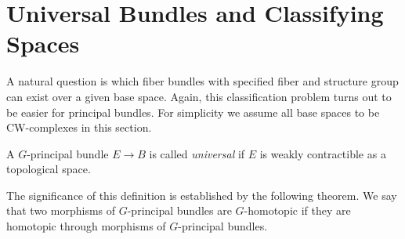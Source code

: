 
\section{Universal Bundles and Classifying Spaces}
A natural question is which fiber bundles with specified fiber and structure group can exist over a given base space. Again, this classification problem turns out to be easier for principal bundles.
For simplicity we assume all base spaces to be CW-complexes in this section.

\begin{definition}
    A $G$-principal bundle $E \to B$ is called \textit{universal} if $E$ is weakly contractible as a topological space.
\end{definition}

The significance of this definition is established by the following theorem. We say that two morphisms of $G$-principal bundles are $G$-homotopic if they are homotopic through morphisms of $G$-principal bundles.

